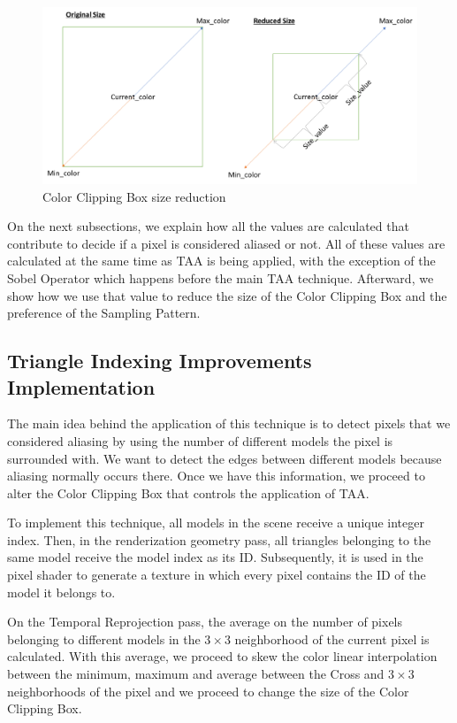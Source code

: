 \documentclass{cslthse-msc}
\begin{document}
\begin{figure}[!hbt]
	\centering
	\includegraphics[scale=0.7]{images/clipping_box_reduction.png}
	\caption{Color Clipping Box size reduction}\label{fig:colorclippingboxredux}
\end{figure}

On the next subsections, we explain how all the values are calculated that contribute to decide if a pixel is considered aliased or not. All of these values are calculated at the same time as TAA is being applied, with the exception of the Sobel Operator which happens before the main TAA technique. Afterward, we show how we use that value to reduce the size of the Color Clipping Box and the preference of the Sampling Pattern.

\subsection{Triangle Indexing Improvements Implementation}
The main idea behind the application of this technique is to detect pixels that we considered aliasing by using the number of different models the pixel is surrounded with. We want to detect the edges between different models because aliasing normally occurs there. Once we have this information, we proceed to alter the Color Clipping Box that controls the application of TAA.

To implement this technique, all models in the scene receive a unique integer index. Then, in the renderization geometry pass, all triangles belonging to the same model receive the model index as its ID. Subsequently, it is used in the pixel shader to generate a texture in which every pixel contains the ID of the model it belongs to.

On the Temporal Reprojection pass, the average on the number of pixels belonging to different models in the $3\times 3$ neighborhood of the current pixel is calculated. With this average, we proceed to skew the color linear interpolation between the minimum, maximum and average between the Cross and $3\times 3$ neighborhoods of the pixel and we proceed to change the size of the Color Clipping Box. 
\end{document}
